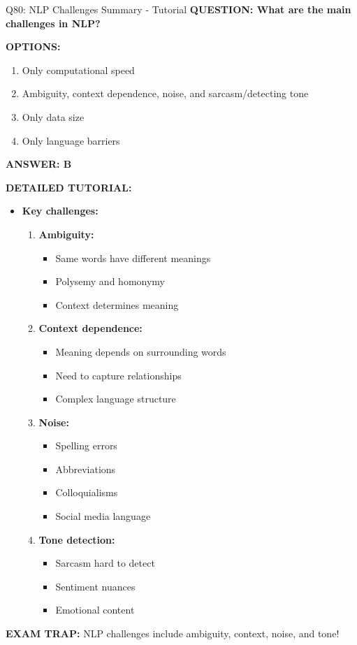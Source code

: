 \documentclass[8pt]{beamer}
\begin{document}
	\begin{frame}{Q80: NLP Challenges Summary - Tutorial}
		\fontsize{6.5}{7.5}\selectfont
		\textbf{QUESTION: What are the main challenges in NLP?}
		
		\vspace{0.1cm}
		\textbf{OPTIONS:}
		\begin{enumerate}
			\item Only computational speed
			\item Ambiguity, context dependence, noise, and sarcasm/detecting tone
			\item Only data size
			\item Only language barriers
		\end{enumerate}
		
		\vspace{0.1cm}
		\textcolor{myblue}{\textbf{ANSWER: B}}
		
		\vspace{0.1cm}
		\textbf{DETAILED TUTORIAL:}
		\begin{itemize}
			\item \textbf{Key challenges:}
			\begin{enumerate}
				\item \textbf{Ambiguity:}
				\begin{itemize}
					\item Same words have different meanings
					\item Polysemy and homonymy
					\item Context determines meaning
				\end{itemize}
				\item \textbf{Context dependence:}
				\begin{itemize}
					\item Meaning depends on surrounding words
					\item Need to capture relationships
					\item Complex language structure
				\end{itemize}
				\item \textbf{Noise:}
				\begin{itemize}
					\item Spelling errors
					\item Abbreviations
					\item Colloquialisms
					\item Social media language
				\end{itemize}
				\item \textbf{Tone detection:}
				\begin{itemize}
					\item Sarcasm hard to detect
					\item Sentiment nuances
					\item Emotional content
				\end{itemize}
			\end{enumerate}
		\end{itemize}
		
		\textcolor{myred}{\textbf{EXAM TRAP:}} NLP challenges include \textcolor{myblue}{ambiguity, context, noise, and tone}!
	\end{frame}
	
\end{document}
